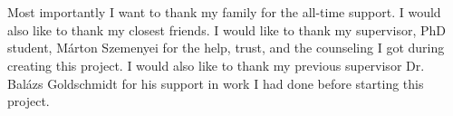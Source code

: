 \chapter*{\koszonetnyilvanitas}

Most importantly I want to thank my family for the all-time support.
I would also like to thank my closest friends. I would like to thank my supervisor, 
PhD student, Márton Szemenyei for the help,
trust, and the counseling I got during creating this project. I would also like
to thank my previous supervisor Dr. Balázs Goldschmidt for his support in work I
had done before starting this project. 